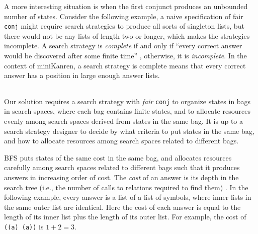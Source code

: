 \documentclass[format=acmlarge, review=true, authordraft=true]{acmart}
\newcommand{\conj}{\texttt{conj}}
\newcommand{\BFS}[0]{BFS}
\begin{document}
\begin{center}
	\begin{tabular}{c}
		
	\end{tabular}
\end{center}

A more interesting situation is when the first conjunct produces an unbounded
number of states. Consider the following example, a naive specification of 
fair \conj{} 
might require search strategies to produce all sorts of singleton lists, but 
there
would not be any lists of length two or longer, which makes the strategies 
incomplete. 
A search strategy is \emph{complete} if and only if ``every correct answer 
would be discovered after some finite time'' \cite{seres1999algebra}, 
otherwise, it is \emph{incomplete}. In the 
context of miniKanren, a search strategy is complete means that every correct 
answer has a position in large enough answer lists.


\begin{center}
	\begin{tabular}{c}
		
	\end{tabular}
\end{center}

Our solution requires a search strategy with \emph{fair} \conj{} to organize
states in bags in search spaces, where each bag contains finite states, and 
to allocate resources evenly among search spaces derived from states in the 
same bag. It is up to a search strategy designer to decide by what criteria to 
put states in the same bag, and how to allocate resources among search spaces 
related to different bags.

\BFS{} puts states of the same cost in the same bag, and allocates
resources carefully among search spaces related to different bags such
that it produces answers in increasing order of cost. The \emph{cost}
of an answer is its depth in the search tree (i.e., the number of
calls to relations required to find them) \citep{seres1999algebra}. In
the following example, every answer is a list of a list of symbols,
where inner lists in the same outer list are identical. Here the cost of each 
answer is equal
to the length of its inner list plus the length of its outer list. For example,
the cost of \texttt{((a) (a))} is $1 + 2 = 3$.
\end{document}
